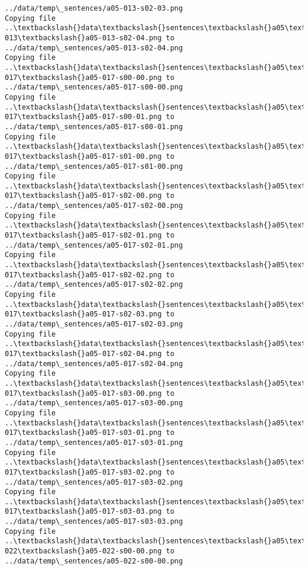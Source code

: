 \documentclass[11pt]{article}
\begin{document}
\begin{Verbatim}[commandchars=\\\{\}]
../data/temp\_sentences/a05-013-s02-03.png
Copying file ..\textbackslash{}data\textbackslash{}sentences\textbackslash{}a05\textbackslash{}a05-013\textbackslash{}a05-013-s02-04.png to
../data/temp\_sentences/a05-013-s02-04.png
Copying file ..\textbackslash{}data\textbackslash{}sentences\textbackslash{}a05\textbackslash{}a05-017\textbackslash{}a05-017-s00-00.png to
../data/temp\_sentences/a05-017-s00-00.png
Copying file ..\textbackslash{}data\textbackslash{}sentences\textbackslash{}a05\textbackslash{}a05-017\textbackslash{}a05-017-s00-01.png to
../data/temp\_sentences/a05-017-s00-01.png
Copying file ..\textbackslash{}data\textbackslash{}sentences\textbackslash{}a05\textbackslash{}a05-017\textbackslash{}a05-017-s01-00.png to
../data/temp\_sentences/a05-017-s01-00.png
Copying file ..\textbackslash{}data\textbackslash{}sentences\textbackslash{}a05\textbackslash{}a05-017\textbackslash{}a05-017-s02-00.png to
../data/temp\_sentences/a05-017-s02-00.png
Copying file ..\textbackslash{}data\textbackslash{}sentences\textbackslash{}a05\textbackslash{}a05-017\textbackslash{}a05-017-s02-01.png to
../data/temp\_sentences/a05-017-s02-01.png
Copying file ..\textbackslash{}data\textbackslash{}sentences\textbackslash{}a05\textbackslash{}a05-017\textbackslash{}a05-017-s02-02.png to
../data/temp\_sentences/a05-017-s02-02.png
Copying file ..\textbackslash{}data\textbackslash{}sentences\textbackslash{}a05\textbackslash{}a05-017\textbackslash{}a05-017-s02-03.png to
../data/temp\_sentences/a05-017-s02-03.png
Copying file ..\textbackslash{}data\textbackslash{}sentences\textbackslash{}a05\textbackslash{}a05-017\textbackslash{}a05-017-s02-04.png to
../data/temp\_sentences/a05-017-s02-04.png
Copying file ..\textbackslash{}data\textbackslash{}sentences\textbackslash{}a05\textbackslash{}a05-017\textbackslash{}a05-017-s03-00.png to
../data/temp\_sentences/a05-017-s03-00.png
Copying file ..\textbackslash{}data\textbackslash{}sentences\textbackslash{}a05\textbackslash{}a05-017\textbackslash{}a05-017-s03-01.png to
../data/temp\_sentences/a05-017-s03-01.png
Copying file ..\textbackslash{}data\textbackslash{}sentences\textbackslash{}a05\textbackslash{}a05-017\textbackslash{}a05-017-s03-02.png to
../data/temp\_sentences/a05-017-s03-02.png
Copying file ..\textbackslash{}data\textbackslash{}sentences\textbackslash{}a05\textbackslash{}a05-017\textbackslash{}a05-017-s03-03.png to
../data/temp\_sentences/a05-017-s03-03.png
Copying file ..\textbackslash{}data\textbackslash{}sentences\textbackslash{}a05\textbackslash{}a05-022\textbackslash{}a05-022-s00-00.png to
../data/temp\_sentences/a05-022-s00-00.png

\end{Verbatim}
\end{document}
